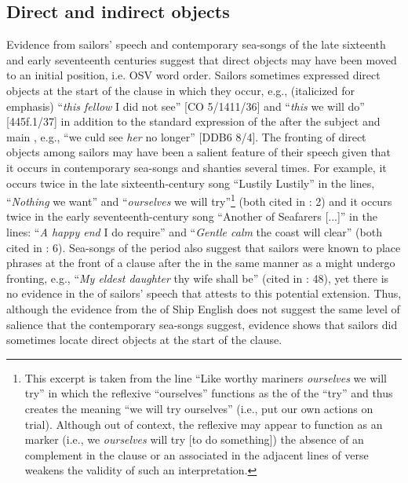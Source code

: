 \subsection{{Direct and indirect objects} }%

Evidence from sailors’ speech and contemporary sea-songs of the late sixteenth and early seventeenth centuries suggest that direct objects may have been moved to an initial position, i.e. OSV word order. Sailors sometimes expressed direct objects at the start of the clause in which they occur, e.g., (italicized for emphasis) “\textit{this fellow} I did not see” [CO 5/1411/36] and “\textit{this} we will do” [445f.1/37] in addition to the standard expression of the  after the subject and main , e.g., “we culd see \textit{her} no longer” [DDB6 8/4]. The fronting of direct objects among sailors may have been a salient feature of their speech given that it occurs in contemporary sea-songs and shanties several times. For example, it occurs twice in the late sixteenth-century song “Lustily Lustily” in the lines, “\textit{Nothing} we want” and “\textit{ourselves} we will try”\footnote{This excerpt is taken from the line “Like worthy mariners \textit{ourselves} we will try” in which the reflexive “ourselves” functions as the  of the  “try” and thus creates the meaning “we will try ourselves” (i.e., put our own actions on trial). Although out of context, the reflexive may appear to function as an  marker (i.e., we \textit{ourselves} will try [to do something]) the absence of an  complement in the clause or an associated  in the adjacent lines of verse weakens the validity of such an interpretation.}  (both cited in \citealt{Palmer1986}: 2) and it occurs twice in the early seventeenth-century song “Another of Seafarers [...]” in the lines:  “\textit{A happy end} I do require” and “\textit{Gentle calm} the coast will clear” (both cited in \citealt{Palmer1986}: 6). Sea-songs of the period also suggest that sailors were known to place  phrases at the front of a clause after the  in the same manner as a  might undergo fronting, e.g., “\textit{My eldest daughter} thy wife shall be” (cited in \citealt{Palmer1986}: 48), yet there is no evidence in the  of sailors’ speech that attests to this potential extension. Thus, although the evidence from the  of Ship English does not suggest the same level of salience that the contemporary sea-songs suggest, evidence shows that sailors did sometimes locate direct objects at the start of the clause. 

